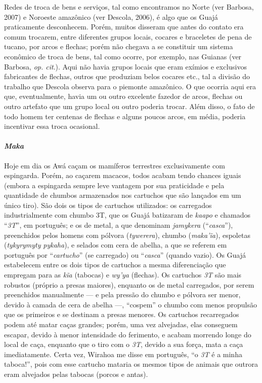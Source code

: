 Redes de troca de bens e serviços, tal como encontramos no Norte (ver
Barbosa, 2007) e Noroeste amazônico (ver Descola, 2006), é algo que os
Guajá praticamente desconhecem. Porém, muitos disseram que antes do
contato era comum trocarem, entre diferentes grupos locais, cocares e
braceletes de pena de tucano, por arcos e flechas; porém não chegava a
se constituir um sistema econômico de troca de bens, tal como ocorre,
por exemplo, nas Guianas (ver Barbosa, \emph{op. cit}.). Aqui não havia grupos
locais que eram exímios e exclusivos fabricantes de flechas, outros que
produziam belos cocares etc., tal a divisão do trabalho que Descola
observa para o piemonte amazônico. O que ocorria aqui era que,
eventualmente, havia um ou outro excelente fazedor de arcos, flechas ou
outro artefato que um grupo local ou outro poderia trocar. Além disso, o
fato de todo homem ter centenas de flechas e alguns poucos arcos, em
média, poderia incentivar essa troca ocasional.

\paragraph{\emph{Maka}}

Hoje em dia os Awá caçam os mamíferos terrestres exclusivamente com
espingarda. Porém, ao caçarem macacos, todos acabam tendo chances iguais
(embora a espingarda sempre leve vantagem por sua praticidade e pela
quantidade de chumbos armazenados nos cartuchos que são lançados em um
único tiro). São dois os tipos de cartuchos utilizados: os carregados
industrialmente com chumbo 3T, que os Guajá batizaram de \emph{kaapo} e
chamados ``\emph{3T}'', em português; e os de metal, a que denominam
\emph{jamykera} (``\emph{casca}''), preenchidos pelos homens com pólvora
(\emph{tywerera}), chumbo (\emph{maka'ĩa}), espoletas (\emph{tykyrymyty}
\emph{pykaha}), e selados com cera de abelha, a que se referem em
português por ``\emph{cartucho}'' (se carregado) ou ``\emph{casca}'' (quando
vazio). Os Guajá estabelecem entre os dois tipos de cartuchos a mesma
diferenciação que empregam para as \emph{kĩa} (tabocas) e \emph{wy'ya}
(flechas). Os cartuchos \emph{3T} são mais robustos (próprio a presas
maiores), enquanto os de metal carregados, por serem preenchidos
manualmente --- e pela pressão do chumbo e pólvora ser menor, devido à
camada de cera de abelha ---, ``cospem'' o chumbo com menos propulsão que
os primeiros e se destinam a presas menores. Os cartuchos recarregados
podem até matar caças grandes; porém, uma vez alvejadas, elas conseguem
escapar, devido à menor intensidade do ferimento, e acabam morrendo
longe do local de caça, enquanto que o tiro com o \emph{3T}, devido a
sua força, mata a caça imediatamente. Certa vez, Wirahoa me disse em
português, ``o \emph{3T} é a minha taboca!'', pois com esse cartucho
mataria os mesmos tipos de animais que outrora eram alvejados pelas
tabocas (porcos e antas).

